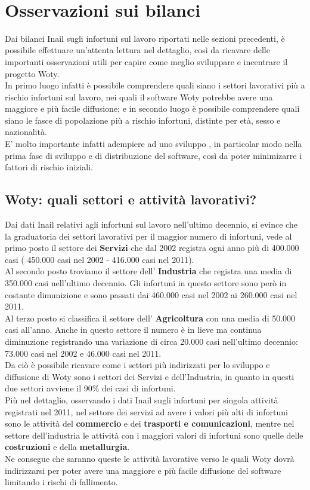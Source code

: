 \ \ \
\section{Osservazioni sui bilanci}
Dai bilanci Inail sugli infortuni sul lavoro riportati nelle sezioni precedenti, è possibile effettuare un'attenta lettura nel dettaglio, così da ricavare delle importanti osservazioni utili per capire come meglio sviluppare e incentrare il progetto Woty.\\
In primo luogo infatti è possibile comprendere quali siano i settori lavorativi più a rischio infortuni sul lavoro, nei quali il software Woty potrebbe avere una maggiore e più facile diffusione; e in secondo luogo è possibile comprendere quali siano le fasce di popolazione più a rischio infortuni, distinte per età, sesso e nazionalità.\\
E' molto importante infatti adempiere ad uno sviluppo \virgolette{mirato}, in particolar modo nella prima fase di sviluppo e di distribuzione del software, così da poter minimizarre i fattori di rischio iniziali.\\


\subsection{Woty: quali settori e attività lavorativi?}
Dai dati Inail relativi agli infortuni sul lavoro nell'ultimo decennio, si evince che la graduatoria dei settori lavorativi per il maggior numero di infortuni, vede al primo posto il settore dei \textbf{Servizi} che dal 2002 registra ogni anno più di 400.000 casi ( 450.000 casi nel 2002 - 416.000 casi nel 2011).\\
Al secondo posto troviamo il settore dell' \textbf{Industria} che registra una media di 350.000 casi nell'ultimo decennio. Gli infortuni in questo settore sono però in costante dimunizione e sono passati dai 460.000 casi nel 2002 ai 260.000 casi nel 2011.\\
Al terzo posto si classifica il settore dell' \textbf{Agricoltura} con una media di 50.000 casi all'anno. Anche in questo settore il numero è in lieve ma continua diminuzione registrando una variazione di circa 20.000 casi nell'ultimo decennio: 73.000 casi nel 2002 e 46.000 casi nel 2011.\\

Da ciò è possibile ricavare come i settori più indirizzati per lo sviluppo e diffusione di Woty sono i settori dei Servizi e dell'Industria, in quanto in questi due settori avviene il 90\% dei casi di infortuni.\\
Più nel dettaglio, osservando i dati Inail sugli infortuni per singola attività registrati nel 2011, nel settore dei servizi ad avere i valori più alti di infortuni sono le attività del \textbf{commercio} e dei \textbf{trasporti e comunicazioni}, mentre nel settore dell'industria le attività con i maggiori valori di infortuni sono quelle delle \textbf{costruzioni} e della \textbf{metallurgia}.\\
Ne consegue che saranno queste le attività lavorative verso le quali Woty dovrà indirizzarsi per poter avere una maggiore e più facile diffusione del software limitando i rischi di fallimento.\\


